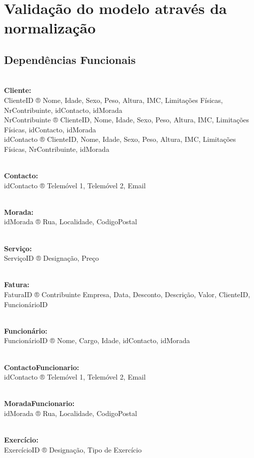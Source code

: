 \section{Validação do modelo através da normalização}

\subsection{Dependências Funcionais}

\noindent
\\\textbf{Cliente:}
\\ClienteID ®  Nome, Idade, Sexo, Peso, Altura, IMC, Limitações Físicas,  NrContribuinte, idContacto, idMorada
\\NrContribuinte ® ClienteID, Nome, Idade, Sexo, Peso, Altura, IMC, Limitações Físicas, idContacto, idMorada
\\idContacto ® ClienteID, Nome, Idade, Sexo, Peso, Altura, IMC, Limitações Físicas, NrContribuinte, idMorada

\noindent
\\\textbf{Contacto:}
\\idContacto ® Telemóvel 1, Telemóvel 2, Email

\noindent
\\\textbf{Morada:}
\\idMorada ® Rua, Localidade, CodigoPostal

\noindent
\\\textbf{Serviço:}
\\ServiçoID ® Designação, Preço

\noindent
\\\textbf{Fatura:}
\\FaturaID ® Contribuinte Empresa, Data, Desconto, Descrição, Valor, ClienteID, FuncionárioID

\noindent
\\\textbf{Funcionário:}
\\FuncionárioID ® Nome, Cargo, Idade, idContacto, idMorada

\noindent
\\\textbf{ContactoFuncionario:}
\\idContacto ® Telemóvel 1, Telemóvel 2, Email

\noindent
\\\textbf{MoradaFuncionario:}
\\idMorada ® Rua, Localidade, CodigoPostal

\noindent
\\\textbf{Exercício:}
\\ExercícioID ® Designação, Tipo de Exercício


